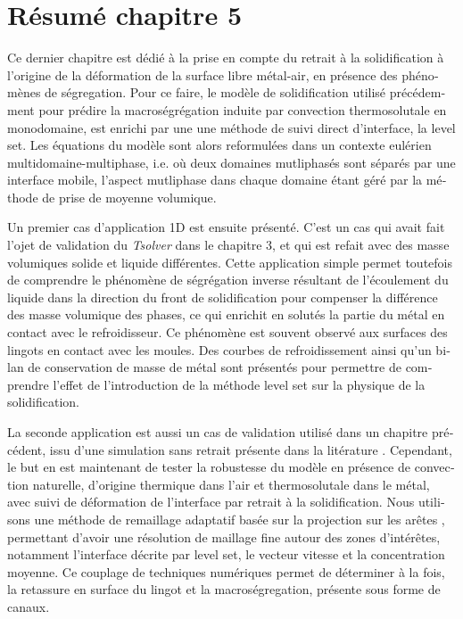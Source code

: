\clearpage
\section*{Résumé chapitre 5}

\begin{otherlanguage}{french}
{\small

Ce dernier chapitre est dédié à la prise en compte du retrait à la solidification à l'origine de la 
déformation de la surface libre métal-air, en présence des phénomènes de ségregation.
Pour ce faire, le modèle de solidification utilisé précédemment pour prédire la macroségrégation induite 
par convection thermosolutale en monodomaine, est enrichi par une
une méthode de suivi direct d'interface, la level set. %
Les équations du modèle sont alors reformulées dans un contexte 
eulérien multidomaine-multiphase, i.e. où deux domaines mutliphasés sont séparés
par une interface mobile, l'aspect mutliphase dans chaque domaine étant géré par la méthode de prise de moyenne volumique. 


Un premier cas d'application 1D est ensuite présenté. C'est un cas qui avait fait l'ojet de validation du \emph{Tsolver} dans le chapitre 3,
et qui est refait avec des masse volumiques solide et liquide différentes. Cette application simple permet toutefois de comprendre le phénomène
de ségrégation inverse résultant de l'écoulement du liquide dans la direction du front de solidification pour compenser la différence
des masse volumique des phases, ce qui enrichit en solutés la partie du métal en contact avec le refroidisseur. 
Ce phénomène est souvent observé aux surfaces des lingots en contact avec les moules. Des courbes de refroidissement ainsi qu'un bilan de conservation de masse de métal sont
présentés pour permettre de comprendre l'effet de l'introduction de la méthode level set sur la physique de la solidification.


La seconde application est aussi un cas de validation utilisé dans un chapitre précédent, issu d'une simulation sans retrait présente dans la litérature \citep{carozzani_direct_2013}.
Cependant, le but en est maintenant de tester la robustesse du modèle
en présence de convection naturelle, d'origine thermique dans l'air et thermosolutale dans le métal, avec suivi de déformation de l'interface par retrait à la solidification.
Nous utilisons une méthode de remaillage adaptatif basée sur la projection sur les arêtes \citep{coupez_solution_2013}, 
permettant d'avoir une résolution de maillage fine autour des zones d'intérêtes, notamment l'interface décrite par level set, le vecteur vitesse
et la concentration moyenne. Ce couplage de techniques numériques permet de déterminer à la fois, la retassure en surface du lingot et la macroségregation,
 présente sous forme de canaux.


}
\end{otherlanguage}
